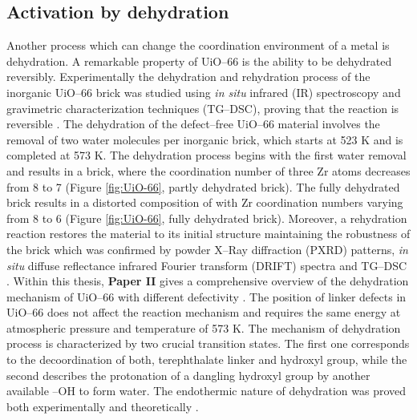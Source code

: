 \subsection*{Activation by dehydration}
Another process which can change the coordination environment of a metal is
dehydration. A remarkable property of UiO--66 is the ability to be dehydrated
reversibly. Experimentally the dehydration and rehydration process of the
inorganic UiO--66 brick was studied using \textit{in situ} infrared (IR) spectroscopy and gravimetric
characterization techniques (TG--DSC), proving that the reaction is
reversible \cite{Shearer2013}. The dehydration of the defect--free UiO--66
material involves the removal of
two water molecules per inorganic brick, which starts at 523 K and is completed
at 573 K. The dehydration process begins with the first water removal and
results in a  brick, where the coordination number of three Zr
atoms decreases from 8 to 7 (Figure \ref{fig:UiO-66}, partly dehydrated brick). The fully dehydrated brick results in a distorted composition of  with Zr coordination numbers
varying from 8 to 6 (Figure \ref{fig:UiO-66}, fully dehydrated brick). Moreover,
a rehydration reaction restores the material to its initial structure maintaining the robustness of the brick which was confirmed by powder X--Ray diffraction (PXRD) patterns, \textit{in situ} diffuse reflectance infrared Fourier transform
(DRIFT) spectra and TG--DSC \cite{Shearer2013, Valenzano2011}. Within this
thesis, \textbf{Paper II} gives a comprehensive overview of the dehydration
mechanism of UiO--66 with different defectivity \cite{Vandichel2016}. The
position of linker defects in UiO--66 does not affect the reaction mechanism and requires the same energy at
atmospheric pressure and temperature of 573 K. The mechanism of dehydration
process is characterized by two crucial transition states.
The first one corresponds to the decoordination of both, terephthalate linker
and hydroxyl group, while the second describes the protonation of a dangling
hydroxyl group by another available --OH to form water. The endothermic
nature of dehydration was proved both experimentally and
theoretically \cite{Shearer2013, Vandichel2016}.


